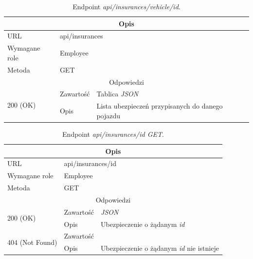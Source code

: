 \documentclass[eng,printmode,openany]{mgr}
\begin{document}
	\begin{table}[H]
		\caption{Endpoint \textit{api/insurances/vehicle/id}.}
		\begin{tabularx}{\textwidth}{|l|l|X|}
			\hline
			\multicolumn{3}{|c|}{Opis}
			\\ \hline
			URL                         & \multicolumn{2}{l|}{api/insurances}
			\\ \hline
			Wymagane role               & \multicolumn{2}{l|}{Employee}
			\\ \hline
			Metoda                      & \multicolumn{2}{l|}{GET}
			\\ \hline
			\multicolumn{3}{|c|}{ Odpowiedzi}
			\\ \hline
			\multirow{2}{*}{200 (OK)}   & Zawartość         & Tablica \textit{JSON}
			\\ \cline{2-3}              & Opis         	    & Lista ubezpieczeń przypisanych do danego pojazdu
			\\ \hline
		\end{tabularx}
	\end{table}
	
	\begin{table}[H]
		\caption{Endpoint \textit{api/insurances/id GET}.}
		\begin{tabularx}{\textwidth}{|l|l|X|}
			\hline
			\multicolumn{3}{|c|}{Opis}
			\\ \hline
			URL                         & \multicolumn{2}{l|}{api/insurances/id}
			\\ \hline
			Wymagane role               & \multicolumn{2}{l|}{Employee}
			\\ \hline
			Metoda                      & \multicolumn{2}{l|}{GET}
			\\ \hline
			\multicolumn{3}{|c|}{Odpowiedzi}
			\\ \hline
			\multirow{2}{*}{200 (OK)} 	        & Zawartość   	& \textit{JSON}
			\\ \cline{2-3}                      & Opis         	& Ubezpieczenie o żądanym \textit{id}
			\\ \hline
			\multirow{2}{*}{404 (Not Found)} 	& Zawartość     & 
			\\ \cline{2-3}                      & Opis          & Ubezpieczenie o żądanym \textit{id} nie istnieje
			\\ \hline
		\end{tabularx}
	\end{table}
	
\end{document}
